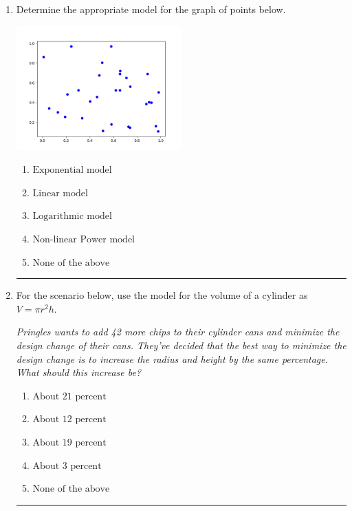 \documentclass[14pt]{extbook}
\newcommand{\litem}[1]{\item#1\hspace*{-1cm}\rule{\textwidth}{0.4pt}}
\begin{document}
\begin{enumerate}
{\begin{enumerate}[label=\Alph*.]
\end{enumerate} }
\litem{
Determine the appropriate model for the graph of points below.
\begin{center}
    \includegraphics[width=0.5\textwidth]{../Figures/identifyModelGraph12CopyB.png}
\end{center}
\begin{enumerate}[label=\Alph*.]
\item \( \text{Exponential model} \)
\item \( \text{Linear model} \)
\item \( \text{Logarithmic model} \)
\item \( \text{Non-linear Power model} \)
\item \( \text{None of the above} \)

\end{enumerate} }
\litem{
For the scenario below, use the model for the volume of a cylinder as $V = \pi r^2 h$.
\begin{center}
    \textit{ Pringles wants to add 42 \text{percent} more chips to their cylinder cans and minimize the design change of their cans. They've decided that the best way to minimize the design change is to increase the radius and height by the same percentage. What should this increase be? }
\end{center}
\begin{enumerate}[label=\Alph*.]
\item \( \text{About } 21 \text{ percent} \)
\item \( \text{About } 12 \text{ percent} \)
\item \( \text{About } 19 \text{ percent} \)
\item \( \text{About } 3 \text{ percent} \)
\item \( \text{None of the above} \)


\end{enumerate}}
\end{enumerate}
\end{document}
